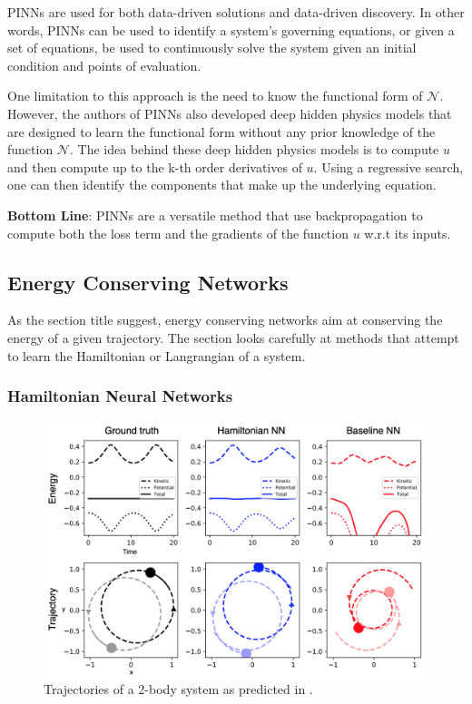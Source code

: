 \documentclass{article}
\begin{document}
PINNs are used for both data-driven solutions and data-driven discovery. In other words, PINNs can be used to identify a system's governing equations, or given a set of equations, be used to continuously solve the system given an initial condition and points of evaluation.

One limitation to this approach is the need to know the functional form of $\mathcal{N}$. However, the authors of PINNs also developed deep hidden physics models \cite{raissi_physics-informed_2019} that are designed to learn the functional form without any prior knowledge of the function $\mathcal{N}$. The idea behind these deep hidden physics models is to compute $u$ and then compute up to the  k-th order derivatives of $u$. Using a regressive search, one can then identify the components that make up the underlying equation. 

\textbf{Bottom Line}: PINNs are a versatile method that use backpropagation to compute both the loss term and the gradients of the function $u$ w.r.t its inputs. 

\subsection{Energy Conserving Networks}

As the section title suggest, energy conserving networks aim at conserving the energy of a given trajectory. The section looks carefully at methods that attempt to learn the Hamiltonian or Langrangian of a system.

\subsubsection{Hamiltonian Neural Networks}
\label{HNN}
\begin{figure}[h]
\centering
\includegraphics[width=\textwidth]{figures/3hnn.png}
\caption{Trajectories of a 2-body system as predicted in \cite{greydanus_hamiltonian_2019}.}
\end{figure}
\end{document}
